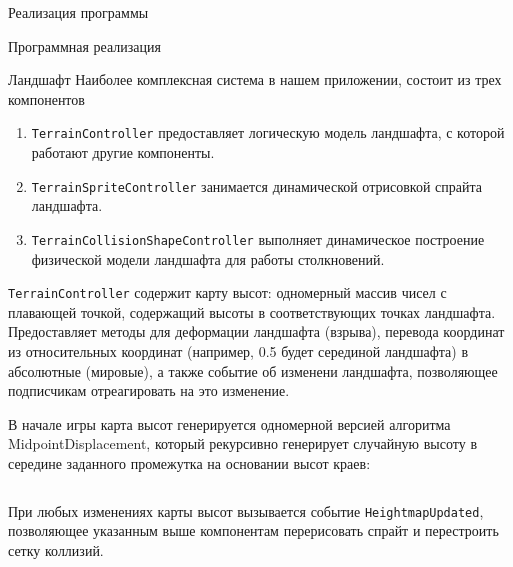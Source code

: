 \documentclass[12pt, a4paper]{article}
\begin{document}
\begin{section}{Реализация программы}
\begin{subsection}{Программная реализация}
			\begin{subsubsection}{Ландшафт}
				Наиболее комплексная система в нашем приложении, состоит из трех компонентов
				\begin{enumerate}
					\item \verb|TerrainController| предоставляет логическую модель ландшафта, с которой работают другие компоненты.
					\item \verb|TerrainSpriteController| занимается динамической отрисовкой спрайта ландшафта.
					\item \verb|TerrainCollisionShapeController| выполняет динамическое построение физической модели ландшафта для работы столкновений.
				\end{enumerate}

				\verb|TerrainController| содержит карту высот: одномерный массив чисел с плавающей точкой, содержащий высоты в соответствующих точках ландшафта.
				Предоставляет методы для деформации ландшафта (взрыва), перевода координат из относительных координат (например, 0.5 будет серединой ландшафта) в абсолютные (мировые), а также событие об изменени ландшафта, позволяющее подписчикам отреагировать на это изменение.

				В начале игры карта высот генерируется одномерной версией алгоритма MidpointDisplacement, который рекурсивно генерирует случайную высоту в середине заданного промежутка на основании высот краев:
				\inputminted{cpp}{listings/MidpointDisplacement1D.cpp}

				При любых изменениях карты высот вызывается событие \verb|HeightmapUpdated|, позволяющее указанным выше компонентам перерисовать спрайт и перестроить сетку коллизий.
			\end{subsubsection}
		\end{subsection}
	\end{section}


	\printbibliography[title = Список использованных источников]
\end{document}
